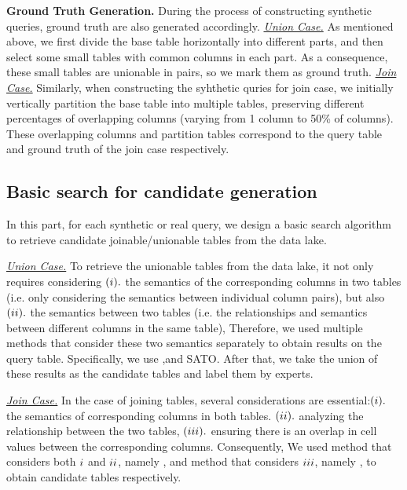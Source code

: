 \noindent \textbf{Ground Truth Generation.} 
During the process of constructing synthetic queries, ground truth are also generated accordingly.
\noindent \underline{\textit{Union Case.}}  
As mentioned above, we first divide the base table horizontally into different parts, and then select some small tables with common columns in each part. As a consequence, these small tables are unionable in pairs, so we mark them as ground truth.
\noindent \underline{\textit{Join Case.}} 
Similarly, when constructing the syhthetic quries for join case, we initially vertically partition the base table into multiple tables, preserving different percentages of overlapping columns (varying from 1 column to 50\% of columns). These overlapping columns and partition tables correspond to the query table and ground truth of the join case respectively.


\subsection{Basic search for candidate generation}
In this part, for each synthetic or real query, we design a basic search algorithm to retrieve  candidate joinable/unionable tables from the data lake. 

\noindent \underline{\textit{Union Case.}}  
To retrieve the unionable tables from the data lake, it not only requires considering $(\romannumeral1 ).$  the semantics of the corresponding columns in two tables (i.e. only considering the semantics between individual column pairs), but also $(\romannumeral2 ).$ the semantics between two tables (i.e. the relationships and semantics between different columns in the same table),  Therefore, we used multiple methods that consider these two semantics separately to obtain results on the query table. Specifically, we use \starmie,\santos and SATO. After that, we take the union of these results as the candidate tables and label them by experts.

\noindent \underline{\textit{Join Case.}}  
In the case of joining tables, several considerations are essential:$(\romannumeral1).$ the semantics of corresponding columns in both tables. $(\romannumeral2).$ analyzing the relationship between the two tables, $(\romannumeral3).$ ensuring there is an overlap in cell values between the corresponding columns. Consequently, We used method that considers both $\romannumeral1$ and $\romannumeral2$, namely \deepjoin, and method that considers $\romannumeral3$, namely \josie, to obtain candidate tables respectively.

